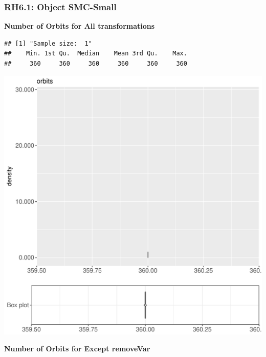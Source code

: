 \documentclass{article}\usepackage[]{graphicx}\usepackage[]{color}
\makeatletter
\def\maxwidth{ %
  \ifdim\Gin@nat@width>\linewidth
    \linewidth
  \else
    \Gin@nat@width
  \fi
}
\newenvironment{kframe}{%
 \def\at@end@of@kframe{}%
 \ifinner\ifhmode%
  \def\at@end@of@kframe{\end{minipage}}%
  \begin{minipage}{\columnwidth}%
 \fi\fi%
 \def\FrameCommand##1{\hskip\@totalleftmargin \hskip-\fboxsep
 \colorbox{shadecolor}{##1}\hskip-\fboxsep
     \hskip-\linewidth \hskip-\@totalleftmargin \hskip\columnwidth}%
 \MakeFramed {\advance\hsize-\width
   \@totalleftmargin\z@ \linewidth\hsize
   \@setminipage}}%
 {\par\unskip\endMakeFramed%
 \at@end@of@kframe}
\newenvironment{knitrout}{}{} %
\makeatother
\begin{document}
\subsubsection{RH6.1: Object SMC-Small}

 \textbf{Number of Orbits for All transformations}
\begin{knitrout}
\color{fgcolor}\begin{kframe}
\begin{verbatim}
## [1] "Sample size:  1"
##    Min. 1st Qu.  Median    Mean 3rd Qu.    Max. 
##     360     360     360     360     360     360
\end{verbatim}


{\ttfamily\noindent\bfseries{}}\end{kframe}
\includegraphics[width=\maxwidth]{figure/RH6_cashew_small-1} 

\end{knitrout}
 \textbf{Number of Orbits for Except removeVar}
\end{document}
